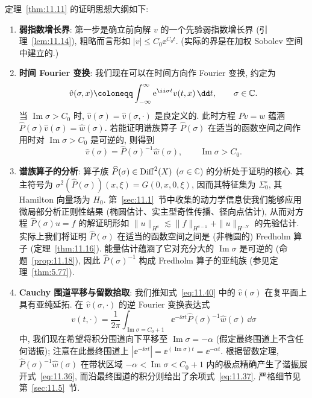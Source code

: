 定理~\ref{thm:11.11} 的证明思想大纲如下:
\begin{enumerate}[label=(\arabic*)]
    \item \textbf{弱指数增长界}: 第一步是确立前向解 $v$ 的一个先验弱指数增长界 (引理~\ref{lem:11.14}), 粗略而言形如 $|v| \le C_0 \ee^{C_0 t}$. (实际的界是在加权 Sobolev 空间中建立的.)
    \item \textbf{时间 Fourier 变换}: 我们现在可以在时间方向作 Fourier 变换, 约定为
    \begin{equation}\label{eq:11.39}
        \hat v(\sigma, x) \defeq \int_{-\infty}^\infty \ee^{\ii \sigma t} v(t, x) \,\dd t, \qquad \sigma \in \mathbb{C}.
    \end{equation}
    当 $\operatorname{Im}\sigma > C_0$ 时, $\hat v(\sigma) = \hat v(\sigma, \cdot)$ 是良定义的. 此时方程 $P v = w$ 蕴涵 $\widehat{P}(\sigma) \hat v(\sigma) = \hat w(\sigma)$. 若能证明谱族算子 $\widehat{P}(\sigma)$ 在适当的函数空间之间作用时对 $\operatorname{Im}\sigma > C_0$ 是可逆的, 则得到
    \begin{equation}\label{eq:11.40}
        \hat v(\sigma) = \widehat{P}(\sigma)^{-1} \hat w(\sigma), \qquad \operatorname{Im}\sigma > C_0.
    \end{equation}
    \item \textbf{谱族算子的分析}: 算子族 $\widehat{P}(\sigma) \in \operatorname{Diff}^2(X)$ ($\sigma \in \mathbb{C}$) 的分析处于证明的核心. 其主符号为 $\sigma^2(\widehat{P}(\sigma))(x, \xi) = G(0, x, 0, \xi)$, 因而其特征集为 $\Sigma_0^\circ$, 其 Hamilton 向量场为 $H_0$. 第~\ref{sec:11.1}~节中收集的动力学信息使我们能够应用微局部分析正则性结果 (椭圆估计、实主型奇性传播、径向点估计), 从而对方程 $\widehat{P}(\sigma) u = f$ 的解证明形如 $\|u\|_{H^s} \lesssim \|f\|_{H^{s-1}} + \|u\|_{H^{-N}}$ 的先验估计. 实际上我们将证明 $\widehat{P}(\sigma)$ 在适当的函数空间之间是 (非椭圆的) Fredholm 算子 (定理~\ref{thm:11.16}). 能量估计蕴涵了它对充分大的 $\operatorname{Im}\sigma$ 是可逆的 (命题~\ref{prop:11.18}), 因此 $\widehat{P}(\sigma)^{-1}$ 构成 Fredholm 算子的亚纯族 (参见定理~\ref{thm:5.77}).
    \item \textbf{Cauchy 围道平移与留数拾取}: 我们推知式~\eqref{eq:11.40} 中的 $\hat v(\sigma)$ 在复平面上具有亚纯延拓. 在 $\hat v(\sigma, \cdot)$ 的逆 Fourier 变换表达式
    \begin{equation}\label{eq:11.41}
        v(t, \cdot) = \frac{1}{2\pi} \int_{\operatorname{Im}\sigma = C_0 + 1} \ee^{-\ii \sigma t} \widehat{P}(\sigma)^{-1} \hat w(\sigma) \,\dd \sigma
    \end{equation}
    中, 我们现在希望将积分围道向下平移至 $\operatorname{Im}\sigma = -\alpha$ (假定最终围道上不含任何谐振); 注意在此最终围道上 $|\ee^{-\ii \sigma t}| = \ee^{(\operatorname{Im}\sigma)t} = \ee^{-\alpha t}$. 根据留数定理, $\widehat{P}(\sigma)^{-1} \hat w(\sigma)$ 在带状区域 $-\alpha < \operatorname{Im}\sigma < C_0 + 1$ 内的极点精确产生了谐振展开式~\eqref{eq:11.36}, 而沿最终围道的积分则给出了余项式~\eqref{eq:11.37}. 严格细节见第~\ref{sec:11.5}~节.

\end{enumerate}
